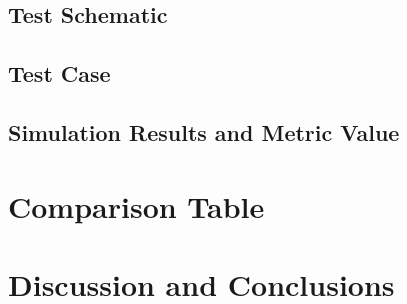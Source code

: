 \documentclass[12pt]{article}
\begin{document}
\subsection{Test Schematic}



\newpage

\subsection{Test Case}



\newpage

\subsection{Simulation Results and Metric Value}



\newpage

\section{Comparison Table}



\newpage

\section{Discussion and Conclusions}
\end{document}
